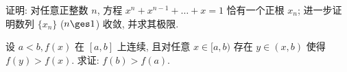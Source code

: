 \begin{exercise}[2.C.9]
    证明: 对任意正整数 $n$, 方程 $x^n+x^{n-1}+\dots+x=1$ 恰有一个正根 $x_n$; 进一步证明数列 $\{x_n\}$ ($n \ges 1$) 收敛, 并求其极限.
\end{exercise}

\begin{exercise}[2.C.10]
    设 $a<b, f(x)$ 在 $[a,b]$ 上连续, 且对任意 $x \in [a,b)$ 存在 $y \in (x,b)$ 使得 $f(y)>f(x)$. 求证: $f(b)>f(a)$.
\end{exercise}

\newpage